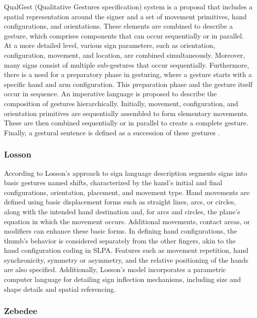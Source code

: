 QualGest (Qualitative Gestures specification) system is a \textcite{lebourque1999high} proposal that includes a spatial representation around the signer and a set of movement primitives, hand configurations, and orientations. These elements are combined to describe a gesture, which comprises components that can occur sequentially or in parallel. At a more detailed level, various sign parameters, such as orientation, configuration, movement, and location, are combined simultaneously. Moreover, many signs consist of multiple sub-gestures that occur sequentially. Furthermore, there is a need for a preparatory phase in gesturing, where a gesture starts with a specific hand and arm configuration. This preparation phase and the gesture itself occur in sequence. An imperative language is proposed to describe the composition of gestures hierarchically. Initially, movement, configuration, and orientation primitives are sequentially assembled to form elementary movements. These are then combined sequentially or in parallel to create a complete gesture. Finally, a gestural sentence is defined as a succession of these gestures \parencite{lebourque1999high}.

\subsubsection{Losson}

According to \textcite{naert2020survey} Losson's approach to sign language description segments signs into basic gestures named shifts, characterized by the hand's initial and final configurations, orientation, placement, and movement type. Hand movements are defined using basic displacement forms such as straight lines, arcs, or circles, along with the intended hand destination and, for arcs and circles, the plane's equation in which the movement occurs. Additional movements, contact areas, or modifiers can enhance these basic forms. In defining hand configurations, the thumb's behavior is considered separately from the other fingers, akin to the hand configuration coding in SLPA. Features such as movement repetition, hand synchronicity, symmetry or asymmetry, and the relative positioning of the hands are also specified. Additionally, Losson's model incorporates a parametric computer language for detailing sign inflection mechanisms, including size and shape details and spatial referencing.

\subsubsection{Zebedee}

